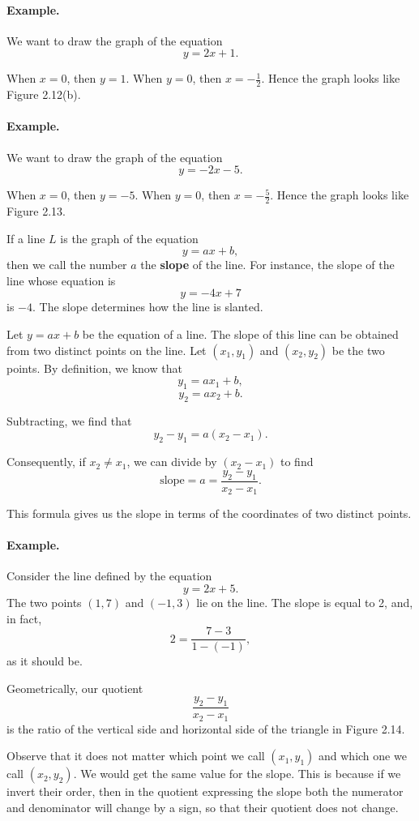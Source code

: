 \documentclass[12pt]{book} %
\begin{document}
\paragraph{Example.}
We want to draw the graph of the equation
\[
y=2x+1.
\]

When $x=0$, then $y=1$. When $y=0$, then $x=-\frac12$. Hence the graph looks like Figure 2.12(b).


\paragraph{Example.}
We want to draw the graph of the equation
\[
y=-2x-5.
\]

When $x=0$, then $y=-5$. When $y=0$, then $x=-\frac52$. Hence the graph looks like Figure 2.13.


If a line $L$ is the graph of the equation
\[
y=ax+b,
\]
then we call the number $a$ the \textbf{slope} of the line. For instance, the slope of the line whose equation is
\[
y=-4x+7
\]
is $-4$. The slope determines how the line is slanted.

Let $y=ax+b$ be the equation of a line. The slope of this line can be obtained from two distinct points on the line. Let $(x_1,y_1)$ and $(x_2,y_2)$ be the two points. By definition, we know that
\[
y_1=ax_1+b,
\]
\[
y_2=ax_2+b.
\]

Subtracting, we find that
\[
y_2-y_1=a(x_2-x_1).
\]

Consequently, if $x_2\ne x_1$, we can divide by $(x_2-x_1)$ to find
\[
\text{slope}=a=\frac{y_2-y_1}{x_2-x_1}.
\]

This formula gives us the slope in terms of the coordinates of two distinct points.

\paragraph{Example.}
Consider the line defined by the equation
\[
y=2x+5.
\]
The two points $(1,7)$ and $(-1,3)$ lie on the line. The slope is equal to 2, and, in fact,
\[
2=\frac{7-3}{1-(-1)},
\]
as it should be.

Geometrically, our quotient
\[
\frac{y_2-y_1}{x_2-x_1}
\]
is the ratio of the vertical side and horizontal side of the triangle in Figure 2.14.


Observe that it does not matter which point we call $(x_1,y_1)$ and which one we call $(x_2,y_2)$. We would get the same value for the slope. This is because if we invert their order, then in the quotient expressing the slope both the numerator and denominator will change by a sign, so that their quotient does not change.
\end{document}
